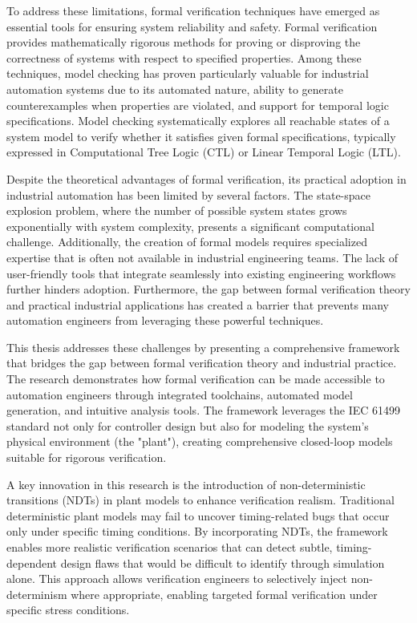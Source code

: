 To address these limitations, formal verification techniques have emerged as essential tools for ensuring system reliability and safety. Formal verification provides mathematically rigorous methods for proving or disproving the correctness of systems with respect to specified properties. Among these techniques, model checking has proven particularly valuable for industrial automation systems due to its automated nature, ability to generate counterexamples when properties are violated, and support for temporal logic specifications. Model checking systematically explores all reachable states of a system model to verify whether it satisfies given formal specifications, typically expressed in Computational Tree Logic (CTL) or Linear Temporal Logic (LTL).

Despite the theoretical advantages of formal verification, its practical adoption in industrial automation has been limited by several factors. The state-space explosion problem, where the number of possible system states grows exponentially with system complexity, presents a significant computational challenge. Additionally, the creation of formal models requires specialized expertise that is often not available in industrial engineering teams. The lack of user-friendly tools that integrate seamlessly into existing engineering workflows further hinders adoption. Furthermore, the gap between formal verification theory and practical industrial applications has created a barrier that prevents many automation engineers from leveraging these powerful techniques.

This thesis addresses these challenges by presenting a comprehensive framework that bridges the gap between formal verification theory and industrial practice. The research demonstrates how formal verification can be made accessible to automation engineers through integrated toolchains, automated model generation, and intuitive analysis tools. The framework leverages the IEC 61499 standard not only for controller design but also for modeling the system's physical environment (the "plant"), creating comprehensive closed-loop models suitable for rigorous verification.

A key innovation in this research is the introduction of non-deterministic transitions (NDTs) in plant models to enhance verification realism. Traditional deterministic plant models may fail to uncover timing-related bugs that occur only under specific timing conditions. By incorporating NDTs, the framework enables more realistic verification scenarios that can detect subtle, timing-dependent design flaws that would be difficult to identify through simulation alone. This approach allows verification engineers to selectively inject non-determinism where appropriate, enabling targeted formal verification under specific stress conditions.

